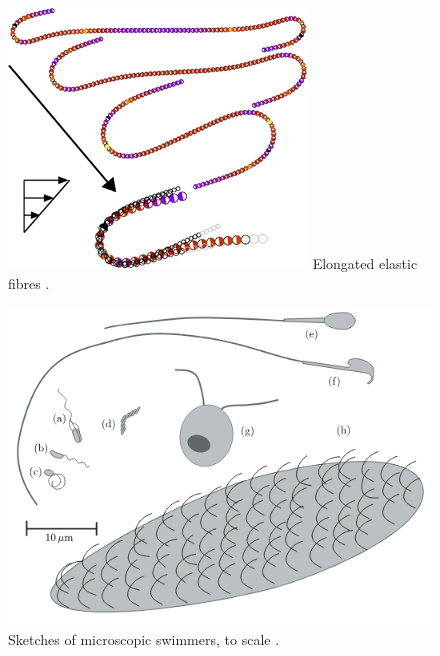 \documentclass{beamer}
\begin{document}
\begin{frame}
\begin{overlayarea}{\textwidth}{\textheight}
\begin{figure}
\begin{minipage}{0.3\linewidth}
		\includegraphics[width=\linewidth]{plots/application6.png} 
		\centering \scriptsize Elongated elastic fibres \cite{zuk2021universal}.
	\end{minipage}
		\begin{minipage}{0.32\linewidth}
		\centering
		\includegraphics[width=\linewidth]{plots/application1.png} 
		\centering \scriptsize Sketches of microscopic swimmers, to scale \cite{lauga2009hydrodynamics}.
	\end{minipage}
		\begin{minipage}{0.35\linewidth}
	\centering

\end{minipage}
\end{figure}
\end{overlayarea}
\end{frame}
\end{document}
